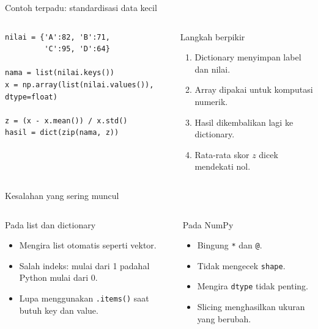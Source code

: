 \documentclass[aspectratio=169,11pt]{beamer}
\begin{document}
\begin{frame}[fragile]{Contoh terpadu: standardisasi data kecil}
\begin{columns}[T]
\begin{lstlisting}
nilai = {'A':82, 'B':71,
         'C':95, 'D':64}

nama = list(nilai.keys())
x = np.array(list(nilai.values()), dtype=float)

z = (x - x.mean()) / x.std()
hasil = dict(zip(nama, z))
\end{lstlisting}
\begin{block}{Langkah berpikir}
\begin{enumerate}\small
  \item Dictionary menyimpan label dan nilai.
  \item Array dipakai untuk komputasi numerik.
  \item Hasil dikembalikan lagi ke dictionary.
  \item Rata-rata skor $z$ dicek mendekati nol.
\end{enumerate}
\end{block}
\end{columns}
\end{frame}

\begin{frame}{Kesalahan yang sering muncul}
\begin{columns}[T]
\begin{block}{Pada list dan dictionary}
\begin{itemize}
  \item Mengira list otomatis seperti vektor.
  \item Salah indeks: mulai dari 1 padahal Python mulai dari 0.
  \item Lupa menggunakan \texttt{.items()} saat butuh key dan value.
\end{itemize}
\end{block}
\begin{block}{Pada NumPy}
\begin{itemize}
  \item Bingung \texttt{*} dan \texttt{@}.
  \item Tidak mengecek \texttt{shape}.
  \item Mengira \texttt{dtype} tidak penting.
  \item Slicing menghasilkan ukuran yang berubah.
\end{itemize}
\end{block}
\end{columns}
\end{frame}
\end{document}
